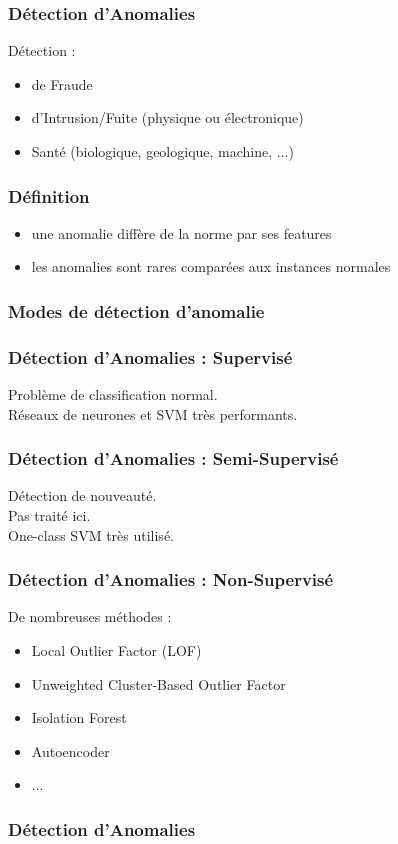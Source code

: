 \begin{frame}
  \frametitle{Détection d'Anomalies}
  Détection :
  \begin{itemize}
  \item de Fraude
  \item d'Intrusion/Fuite (physique ou électronique)
  \item Santé (biologique, geologique, machine, ...)
  \end{itemize}
\end{frame}

\begin{frame}
  \frametitle{Définition}
  \begin{itemize}
  \item une anomalie diffère de la norme par ses features
  \item les anomalies sont rares comparées aux instances normales
  \end{itemize}
\end{frame}

\begin{frame}
  \frametitle{Modes de détection d'anomalie}
\end{frame}

\begin{frame}
  \frametitle{Détection d'Anomalies : Supervisé}
  Problème de classification normal. \\
  Réseaux de neurones et SVM très performants.
\end{frame}

\begin{frame}
  \frametitle{Détection d'Anomalies : Semi-Supervisé}
  Détection de nouveauté. \\
  Pas traité ici. \\
  One-class SVM très utilisé.
\end{frame}

\begin{frame}
  \frametitle{Détection d'Anomalies : Non-Supervisé}
  De nombreuses méthodes : 
  \begin{itemize}
  \item Local Outlier Factor (LOF)
  \item Unweighted Cluster-Based Outlier Factor
  \item Isolation Forest
  \item Autoencoder
  \item ...
  \end{itemize}
\end{frame}

\begin{frame}
  \frametitle{Détection d'Anomalies}
\end{frame}


